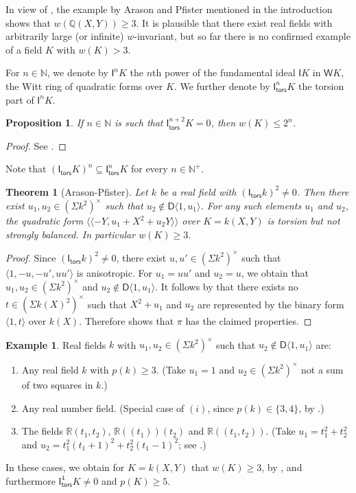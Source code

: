 \documentclass[twoside,11pt]{amsart}
\numberwithin{equation}{section}
\newtheorem{thm}[equation]{Theorem}
\newtheorem{prop}[equation]{Proposition}
\theoremstyle{definition}
\newtheorem{ex}[equation]{Example}
\newcommand{\mg}[1]{{#1}^{\times}}
\newcommand{\nat}{\mathbb{N}}
\newcommand{\la}{\langle}
\newcommand{\ra}{\rangle}
\newcommand{\lla}{\la\!\la}
\newcommand{\rra}{\ra\!\ra}
\renewcommand{\leq}{\leqslant}
\renewcommand{\geq}{\geqslant}
\newcommand{\tors}{\mathsf{tors}}
\newcommand{\W}{\mathsf{W}}
\newcommand{\I}{\mathsf{I}}
\newcommand{\rr}{\mathbb{R}}
\renewcommand{\leq}{\leqslant}
\renewcommand{\geq}{\geqslant}
\newcommand{\D}{\mathsf{D}}
\newcommand{\qq}{\mathbb{Q}}
\begin{document}
In view of , the  example by Arason and Pfister mentioned in the introduction shows that $w(\qq(X,Y))\geq 3$.
It is plausible that there exist real fields with arbitrarily large (or infinite) $w$-invariant, but so far there is no confirmed example of a field $K$ with $w(K)>3$.




For $n\in\nat$, we denote by $\I^n K$ the $n$th power of the fundamental ideal $\I K$ in $\W K$, the Witt ring of quadratic forms over $K$.
We further denote by $\I_\tors^n K$ the torsion part of $\I^n K$.

\begin{prop}\label{In-tors-w}
    If $n\in\nat$ is such that $\I^{n+2}_\tors K=0$, then $w(K)\leq 2^{n}$.
\end{prop}
\begin{proof}
    See \cite[Theorem 3.5]{Bec06}.
\end{proof}

Note that $(\I_\tors K)^n\subseteq \I_\tors^n K$ for every $n\in\nat^+$.

\begin{thm}[Arason-Pfister]\label{AP:w3}
    Let $k$ be a real field  with $(\I_\tors k)^2\neq 0$.
    Then there exist $u_1,u_2\in \mg{(\mathsf{\Sigma}k^2)}$ such that $u_2\notin\D\la 1,u_1\ra$. For any such elements $u_1$ and $u_2$, the quadratic form $\lla -Y,u_1+X^2+u_2Y\rra$ over $K=k(X,Y)$ is torsion but not strongly balanced.
    In particular $w(K)\geq 3$.
\end{thm}
\begin{proof}
    Since $(\I_\tors k)^2\neq 0$, there exist
    $u,u'\in \mg{(\mathsf{\Sigma}k^2)}$ such that $\la 1,-u,-u',uu'\ra$ is anisotropic.
    For $u_1=uu'$ and $u_2=u$, we obtain that $u_1,u_2\in\mg{(\mathsf{\Sigma}k^2)}$ and $u_2\notin \D\la 1,u_1\ra$.
    It follows by \cite[Satz 3]{AP77} that 
    there exists no $t\in\mg{(\mathsf{\Sigma}k(X)^2)}$ such that $X^2+u_1$ and $u_2$
    are represented by the binary form $\la 1,t\ra$ over $k(X)$.
    Therefore \cite[Satz 2]{AP77} shows that $\pi$ has the claimed properties.
\end{proof}

\begin{ex}
 Real fields $k$ with $u_1,u_2\in\mg{(\mathsf{\Sigma}k^2)}$ such that $u_2\notin\D\la 1,u_1\ra$ are:
 \begin{enumerate}[$(i)$]
     \item Any real field $k$ with $p(k)\geq 3$. (Take $u_1=1$ and $u_2\in\mg{(\mathsf{\Sigma}k^2)}$ not a sum of two squares in $k$.)
     \item Any real number field. (Special case of $(i)$, since $p(k)\in\{3,4\}$, by \cite[Chap.~XI, Example 5.9~(2)]{Lam05}.)
     \item The fields $\rr(t_1,t_2)$, $\rr(\!(t_1)\!)(t_2)$ and $\rr(\!(t_1,t_2)\!)$. (Take $u_1=t_1^2+t_2^2$ and $u_2=t_1^2(t_1+1)^2+t_2^2(t_1-1)^2$; see \cite[Example 6.6]{BL11}.)
 \end{enumerate}
 In these cases, we obtain for $K=k(X,Y)$ that $w(K)\geq 3$, by , and  
 furthermore $\I^4_\tors K\neq 0$ and $p(K)\geq 5$.
\end{ex}
\end{document}
